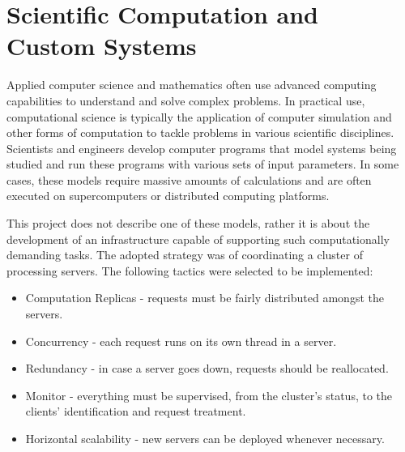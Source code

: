 \documentclass[12pt]{article}
\begin{document}


\newpage
\section{Scientific Computation and Custom Systems} \label{scientificcomputation} %

Applied computer science and mathematics often use advanced computing capabilities to understand and solve complex problems.
In practical use, computational science is typically the application of computer simulation and other forms of computation to tackle problems in various
scientific disciplines.
Scientists and engineers develop computer programs that model systems being studied and run these programs with various sets of input parameters.
In some cases, these models require massive amounts of calculations and are often executed on supercomputers or distributed computing platforms.

This project does not describe one of these models, rather it is about the development of an infrastructure capable of supporting such computationally demanding tasks.
The adopted strategy was of coordinating a cluster of processing servers.
The following tactics were selected to be implemented:
\vspace{-10pt}
\begin{itemize}[noitemsep]
  \item Computation Replicas - requests must be fairly distributed amongst the servers.
  \item Concurrency - each request runs on its own thread in a server.
  \item Redundancy - in case a server goes down, requests should be reallocated.
  \item Monitor - everything must be supervised, from the cluster's status, to the clients' identification and request treatment.
  \item Horizontal scalability - new servers can be deployed whenever necessary.
\end{itemize}
\vspace{-10pt}
\end{document}
